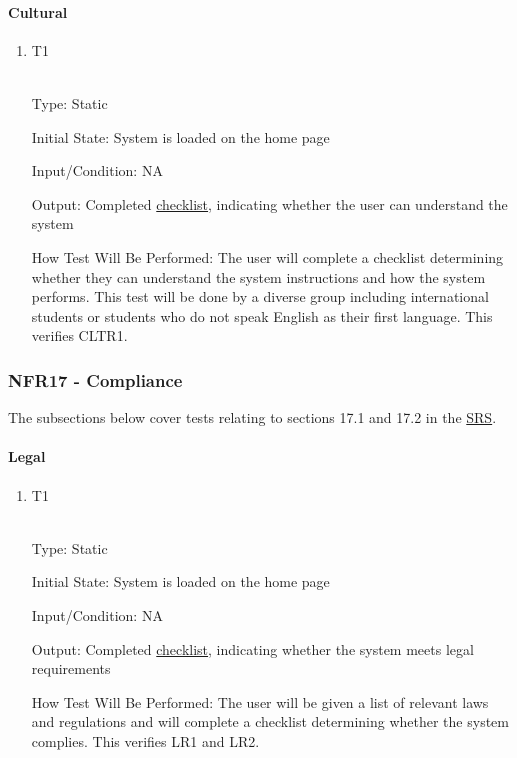 \documentclass[12pt, titlepage]{article}
\begin{document}
\paragraph{Cultural}
\begin{enumerate}
\item {T1\\}\\
\hypertarget{NFR16.1-TC1}{}

Type: Static

Initial State: System is loaded on the home page

Input/Condition: NA

Output: Completed \hyperlink{checlist-nfr16}{checklist}, indicating whether the user can understand the system

How Test Will Be Performed: The user will complete a checklist determining whether they can understand the system instructions and how the system performs. This test will be done by a diverse group including international students or students who do not speak English as their first language. This verifies CLTR1.
\end{enumerate}

\hypertarget{nfr17}{}
\subsubsection{NFR17 - Compliance}

The subsections below cover tests relating to sections 17.1 and 17.2 in the \href{https://shorturl.at/FdAgR}{SRS}.

\paragraph{Legal}
\begin{enumerate}
\item {T1\\}\\
\hypertarget{NFR17.1-TC1}{}

Type: Static

Initial State: System is loaded on the home page

Input/Condition: NA

Output: Completed \hyperlink{checlist-nfr17}{checklist}, indicating whether the system meets legal requirements

How Test Will Be Performed: The user will be given a list of relevant laws and regulations and will complete a checklist determining whether the system complies. This verifies LR1 and LR2.
\end{enumerate}
\end{document}
